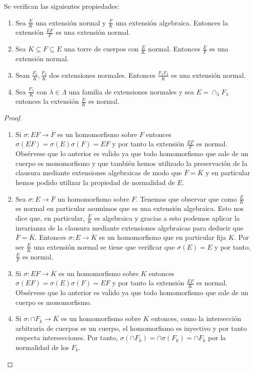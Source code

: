 \begin{proposition}
Se verifican las siguientes propiedades:

\begin{enumerate}
\item Sea $\frac{E}{K}$ una extensión normal y $\frac{F}{K}$ una extensión algebraica. Entonces la extensión $\frac{EF}{F}$ es una extensión normal. 
\item Sea $K \subseteq F \subseteq E$ una torre de cuerpos con $\frac{E}{K}$ normal. Entonces $\frac{E}{F}$ es una extensión normal. 
\item Sean $\frac{F_1}{K},\frac{F_2}{K}$ dos extensiones normales. Entonces $\frac{F_1F_2}{K}$ es una extensión normal. 
\item Sea $\frac{F_\lambda}{K}$ con $\lambda \in \Lambda$ una familia de extensiones normales y sea $E = \cap_\lambda F_\lambda$ entonces la extensión $\frac{E}{K}$ es normal. 
\end{enumerate}
\end{proposition}
\begin{proof}
\begin{enumerate}
\item Si $\sigma:EF \to \overline{F}$ es un homomorfismo sobre $F$ entonces $\sigma(EF) = \sigma(E)\sigma(F) = EF$ y por tanto la extensión $\frac{EF}{F}$ es normal. Obsérvese que lo anterior es vaĺido ya que todo homomorfismo que sale de un cuerpo es monomorfismo y que también hemos utilizado la preservación de la clausura mediante extensiones algebraicas de modo que $\overline{F} = \overline{K}$ y en particular hemos podido utilizar la propiedad de normalidad de $E$.
\item Sea $\sigma:E \to \overline{F}$ un homomorfismo sobre $F$. Tenemos que observar que como $\frac{E}{K}$ es normal en particular asumimos que es una extensión algebraica. Esto nos dice que, en particular, $\frac{F}{K}$ es algebraica y gracias a esto podemos aplicar la invarianza de la clausura mediante extensiones algebraicas para deducir que $\overline{F} = \overline{K}$. Entonces $\sigma:E \to \overline{K}$ es un homomorfismo que en particular fija $K$. Por ser $\frac{E}{K}$ una extensión normal se tiene que verificar que $\sigma(E) = E$ y por tanto, $\frac{E}{F}$ es normal. 
\item Si $\sigma:EF \to \overline{K}$ es un homomorfismo sobre $K$ entonces $\sigma(EF) = \sigma(E)\sigma(F) = EF$ y por tanto la extensión $\frac{EF}{K}$ es normal. Obsérvese que lo anterior es vaĺido ya que todo homomorfismo que sale de un cuerpo es monomorfismo. 
\item  Si $\sigma: \cap F_k \to \overline{K}$ es un homomorfismo sobre $K$ entonces, como la intersección arbitraria de cuerpos es un cuerpo, el homomorfismo es inyectivo y por tanto respecta intersecciones. Por tanto, $\sigma(\cap F_k) = \cap \sigma(F_k) = \cap F_k$ por la normalidad de los $F_k$. 
\end{enumerate}
\end{proof}

